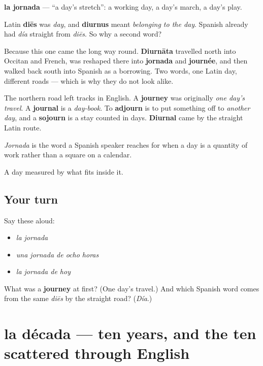 \begin{cousinweb}
\textbf{la jornada} — \textquotedblleft{}a day's stretch\textquotedblright{}: a working day, a day's march, a day's play.

Latin \textbf{diēs} was \emph{day}, and \textbf{diurnus} meant \emph{belonging to the day}. Spanish already had \emph{día} straight from \emph{diēs}. So why a second word?

Because this one came the long way round. \textbf{Diurnāta} travelled north into Occitan and French, was reshaped there into \textbf{jornada} and \textbf{journée}, and then walked back south into Spanish as a borrowing. Two words, one Latin day, different roads — which is why they do not look alike.

The northern road left tracks in English. A \textbf{journey} was originally \emph{one day's travel}. A \textbf{journal} is a \emph{day-book}. To \textbf{adjourn} is to put something off to \emph{another day}, and a \textbf{sojourn} is a stay counted in days. \textbf{Diurnal} came by the straight Latin route.

\emph{Jornada} is the word a Spanish speaker reaches for when a day is a quantity of work rather than a square on a calendar.
\end{cousinweb}

\begin{grammarlens}[title={What you've built}]
A day measured by what fits inside it.
\end{grammarlens}

\subsection*{Your turn}
Say these aloud:

\begin{itemize}
\raggedright
  \item \emph{la jornada}
  \item \emph{una jornada de ocho horas}
  \item \emph{la jornada de hoy}
\end{itemize}

\begin{tcolorbox}[breakable,colback=teal!4,colframe=teal!35!black,title={Before you move on}]
What was a \textbf{journey} at first? (One day's travel.) And which Spanish word comes from the same \emph{diēs} by the straight road? (\emph{Día}.)
\end{tcolorbox}
\section[la década]{la década — ten years, and the ten scattered through English}


